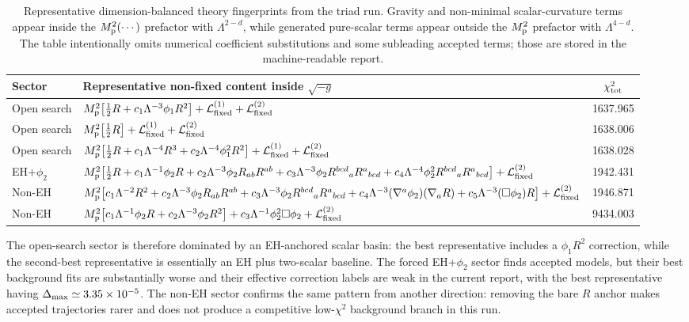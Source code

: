 \documentclass[aps,prd,twocolumn,superscriptaddress,nofootinbib,longbibliography]{revtex4-2}
\newcommand{\Lag}{\mathcal{L}}
\newcommand{\Mp}{M_{\rm p}}
\newcommand{\Lam}{\Lambda}
\newcommand{\chiT}{\chi^2_{\rm tot}}
\begin{document}
\begin{table}[t]
\centering
\begin{ruledtabular}
\begin{tabular}{lp{}c}
Sector & Representative non-fixed content inside $\sqrt{-g}$ & $\chiT$ \\
\hline
Open search &
$\Mp^2\!\left[\frac12 R+c_1\Lam^{-3}\phi_1R^2\right]
+\Lag_{\rm fixed}^{(1)}+\Lag_{\rm fixed}^{(2)}$ &
1637.965 \\
Open search &
$\Mp^2\!\left[\frac12 R\right]
+\Lag_{\rm fixed}^{(1)}+\Lag_{\rm fixed}^{(2)}$ &
1638.006 \\
Open search &
$\Mp^2\!\left[\frac12 R+c_1\Lam^{-4}R^3
+c_2\Lam^{-4}\phi_1^2R^2\right]
+\Lag_{\rm fixed}^{(1)}+\Lag_{\rm fixed}^{(2)}$ &
1638.028 \\
EH+$\phi_2$ &
$\Mp^2\!\left[\frac12 R+c_1\Lam^{-1}\phi_2R
+c_2\Lam^{-3}\phi_2R_{ab}R^{ab}
+c_3\Lam^{-3}\phi_2R^{bcd}{}_{a}R^{a}{}_{bcd}
+c_4\Lam^{-4}\phi_2^2R^{bcd}{}_{a}R^{a}{}_{bcd}\right]
+\Lag_{\rm fixed}^{(2)}$ &
1942.431 \\
Non-EH &
$\Mp^2\!\left[c_1\Lam^{-2}R^2
+c_2\Lam^{-3}\phi_2R_{ab}R^{ab}
+c_3\Lam^{-3}\phi_2R^{bcd}{}_{a}R^{a}{}_{bcd}
+c_4\Lam^{-3}(\nabla^a\phi_2)(\nabla_aR)
+c_5\Lam^{-3}(\Box\phi_2)R\right]
+\Lag_{\rm fixed}^{(2)}$ &
1946.871 \\
Non-EH &
$\Mp^2\!\left[c_1\Lam^{-1}\phi_2R
+c_2\Lam^{-3}\phi_2R^2\right]
+c_3\Lam^{-1}\phi_2^2\Box\phi_2
+\Lag_{\rm fixed}^{(2)}$ &
9434.003 \\
\end{tabular}
\end{ruledtabular}
\caption{Representative dimension-balanced theory fingerprints from the triad run.  Gravity and non-minimal scalar-curvature terms appear inside the $\Mp^2(\cdots)$ prefactor with $\Lam^{2-d}$, while generated pure-scalar terms appear outside the $\Mp^2$ prefactor with $\Lam^{4-d}$.  The table intentionally omits numerical coefficient substitutions and some subleading accepted terms; those are stored in the machine-readable report.}
\label{tab:representative-fingerprints}
\end{table}

The open-search sector is therefore dominated by an EH-anchored scalar basin: the best representative includes a $\phi_1R^2$ correction, while the second-best representative is essentially an EH plus two-scalar baseline.  The forced EH+$\phi_2$ sector finds accepted models, but their best background fits are substantially worse and their effective correction labels are weak in the current report, with the best representative having $\Delta_{\rm max}\simeq3.35\times10^{-5}$.  The non-EH sector confirms the same pattern from another direction: removing the bare $R$ anchor makes accepted trajectories rarer and does not produce a competitive low-$\chi^2$ background branch in this run.
\end{document}
